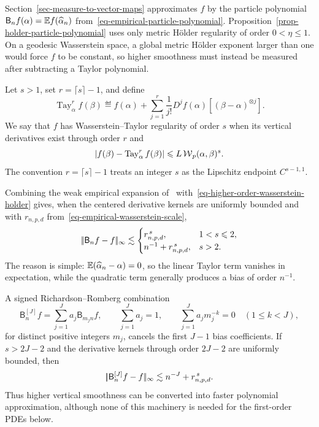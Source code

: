 \begin{rem}\label{rem-higher-order-particle-polynomial}
	Section~\ref{sec-measure-to-vector-maps} approximates \(f\) by the particle polynomial \(\mathsf B_n f(\alpha)=\mathbb{E} f(\widehat\alpha_n)\) from~\eqref{eq-empirical-particle-polynomial}. Proposition~\ref{prop-holder-particle-polynomial} uses only metric H\"older regularity of order \(0<\eta\leq1\). On a geodesic Wasserstein space, a global metric H\"older exponent larger than one would force \(f\) to be constant, so higher smoothness must instead be measured after subtracting a Taylor polynomial.

	Let \(s>1\), set \(r=\lceil s\rceil-1\), and define
	\[
		\operatorname{Tay}_\alpha^r f(\beta)
		\eqdef
		f(\alpha)
		+\sum_{j=1}^r\frac1{j!}
		D^j f(\alpha)[(\beta-\alpha)^{\otimes j}].
	\]
	We say that \(f\) has Wasserstein--Taylor regularity of order \(s\) when its vertical derivatives exist through order \(r\) and
	\begin{equation}\label{eq-higher-order-wasserstein-holder}
		\left|f(\beta)-\operatorname{Tay}_\alpha^r f(\beta)\right|
		\leqslant
		L\operatorname{\mathcal{W}}_p(\alpha,\beta)^s.
	\end{equation}
	The convention \(r=\lceil s\rceil-1\) treats an integer \(s\) as the Lipschitz endpoint \(C^{s-1,1}\).

	Combining the weak empirical expansion of~\cite{ChassagneuxSzpruchTse2022} with~\eqref{eq-higher-order-wasserstein-holder} gives, when the centered derivative kernels are uniformly bounded and with \(r_{n,p,d}\) from~\eqref{eq-empirical-wasserstein-scale},
	\[
		|\!| \mathsf B_n f-f |\!|_\infty
		\lesssim
		\begin{cases}
			r_{n,p,d}^{\,s}, & 1<s\leqslant2,\\
			n^{-1}+r_{n,p,d}^{\,s}, & s>2.
		\end{cases}
	\]
	The reason is simple: \(\mathbb{E}(\widehat\alpha_n-\alpha)=0\), so the linear Taylor term vanishes in expectation, while the quadratic term generally produces a bias of order \(n^{-1}\).

	A signed Richardson--Romberg combination
	\[
		\mathsf B_n^{[J]}f
		=
		\sum_{j=1}^J a_j\mathsf B_{m_jn}f,
		\qquad
		\sum_{j=1}^J a_j=1,
		\qquad
		\sum_{j=1}^J a_jm_j^{-k}=0
		\quad (1\leq k<J),
	\]
	for distinct positive integers \(m_j\), cancels the first \(J-1\) bias coefficients. If \(s>2J-2\) and the derivative kernels through order \(2J-2\) are uniformly bounded, then
	\[
		|\!| \mathsf B_n^{[J]}f-f |\!|_\infty
		\lesssim
		n^{-J}+r_{n,p,d}^{\,s}.
	\]
	Thus higher vertical smoothness can be converted into faster polynomial approximation, although none of this machinery is needed for the first-order PDEs below.
\end{rem}


